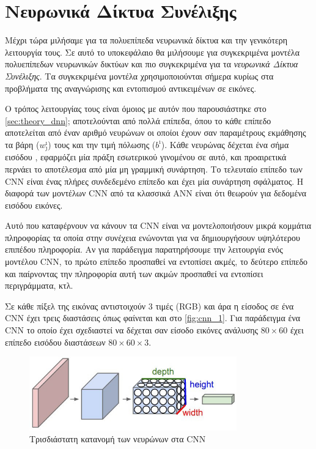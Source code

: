 \section{Νευρωνικά Δίκτυα Συνέλιξης}
\label{sec:theory_cnn}

Μέχρι τώρα μιλήσαμε για τα πολυεπίπεδα νευρωνικά δίκτυα και την γενικότερη
λειτουργία τους. Σε αυτό το υποκεφάλαιο θα μιλήσουμε για συγκεκριμένα μοντέλα
πολυεπίπεδων νευρωνικών δικτύων και πιο συγκεκριμένα για τα
\emph{νευρωνικά Δίκτυα Συνέλιξης}. Τα συγκεκριμένα μοντέλα χρησιμοποιούνται
σήμερα κυρίως στα προβλήματα της αναγνώρισης και εντοπισμού αντικειμένων
σε εικόνες.

Ο τρόπος λειτουργίας τους είναι όμοιος με αυτόν που παρουσιάστηκε στο
\autoref{sec:theory_dnn}; αποτελούνται από πολλά επίπεδα, όπου το κάθε επίπεδο αποτελείται
από έναν αριθμό νευρώνων οι οποίοι έχουν σαν παραμέτρους εκμάθησης τα βάρη ($w_{\jmath}^{\imath}$) τους
και την τιμή πόλωσης ($b^{\imath}$).
Κάθε νευρώνας δέχεται ένα σήμα εισόδου , εφαρμόζει μία πράξη εσωτερικού γινομένου σε αυτό,
και προαιρετικά περνάει το αποτέλεσμα από μία μη γραμμική συνάρτηση.
Το τελευταίο επίπεδο των CNN είναι ένας πλήρες συνδεδεμένο επίπεδο και έχει μία
συνάρτηση σφάλματος.
Η διαφορά των μοντέλων CNN από τα κλασσικά ANN είναι ότι θεωρούν για δεδομένα εισόδου
εικόνες.

Αυτό που καταφέρνουν να κάνουν τα CNN είναι να μοντελοποιήσουν μικρά
κομμάτια πληροφορίας τα οποία στην συνέχεια ενώνονται για να δημιουργήσουν
υψηλότερου επιπέδου πληροφορία. Αν για παράδειγμα παρατηρήσουμε την λειτουργία
ενός μοντέλου CNN, το πρώτο επίπεδο προσπαθεί να εντοπίσει ακμές, το δεύτερο
επίπεδο και παίρνοντας την πληροφορία αυτή των ακμών προσπαθεί να εντοπίσει περιγράμματα,
κτλ.


Σε κάθε πίξελ της εικόνας αντιστοιχούν 3 τιμές (RGB) και άρα η είσοδος σε ένα
CNN έχει τρεις διαστάσεις όπως φαίνεται και στο \autoref{fig:cnn_1}.
Για παράδειγμα ένα CNN το οποίο έχει σχεδιαστεί να δέχεται σαν είσοδο εικόνες ανάλυσης $80\times60$
έχει επίπεδο εισόδου διαστάσεων $80\times60\times3$.

\begin{figure}[!ht]
  \centering
  \includegraphics[width=0.8\textwidth]{./images/chapter3/cnn.jpg}
  \caption[Τρισδιάστατη κατανομή των νευρώνων στα CNN]{Τρισδιάστατη κατανομή των νευρώνων στα CNN}
  \label{fig:cnn_1}
\end{figure}

